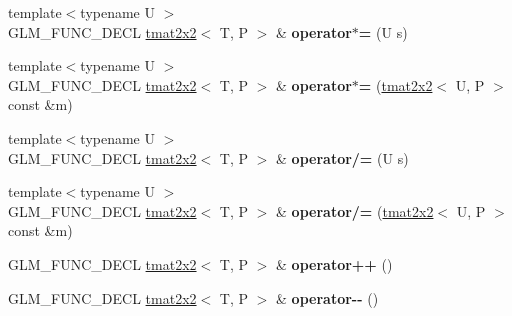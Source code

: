 \begin{DoxyCompactItemize}
\item 
{\footnotesize template$<$typename U $>$ }\\G\+L\+M\+\_\+\+F\+U\+N\+C\+\_\+\+D\+E\+CL \hyperlink{structglm_1_1detail_1_1tmat2x2}{tmat2x2}$<$ T, P $>$ \& {\bfseries operator$\ast$=} (U s)\hypertarget{structglm_1_1detail_1_1tmat2x2_a981d962c4d65dc12703e2b6e723ec981}{}\label{structglm_1_1detail_1_1tmat2x2_a981d962c4d65dc12703e2b6e723ec981}

\item 
{\footnotesize template$<$typename U $>$ }\\G\+L\+M\+\_\+\+F\+U\+N\+C\+\_\+\+D\+E\+CL \hyperlink{structglm_1_1detail_1_1tmat2x2}{tmat2x2}$<$ T, P $>$ \& {\bfseries operator$\ast$=} (\hyperlink{structglm_1_1detail_1_1tmat2x2}{tmat2x2}$<$ U, P $>$ const \&m)\hypertarget{structglm_1_1detail_1_1tmat2x2_ab56306a2ba75e6dbdd7eed704d6a90df}{}\label{structglm_1_1detail_1_1tmat2x2_ab56306a2ba75e6dbdd7eed704d6a90df}

\item 
{\footnotesize template$<$typename U $>$ }\\G\+L\+M\+\_\+\+F\+U\+N\+C\+\_\+\+D\+E\+CL \hyperlink{structglm_1_1detail_1_1tmat2x2}{tmat2x2}$<$ T, P $>$ \& {\bfseries operator/=} (U s)\hypertarget{structglm_1_1detail_1_1tmat2x2_a646ced88a0720120d4664a65a5a5ae29}{}\label{structglm_1_1detail_1_1tmat2x2_a646ced88a0720120d4664a65a5a5ae29}

\item 
{\footnotesize template$<$typename U $>$ }\\G\+L\+M\+\_\+\+F\+U\+N\+C\+\_\+\+D\+E\+CL \hyperlink{structglm_1_1detail_1_1tmat2x2}{tmat2x2}$<$ T, P $>$ \& {\bfseries operator/=} (\hyperlink{structglm_1_1detail_1_1tmat2x2}{tmat2x2}$<$ U, P $>$ const \&m)\hypertarget{structglm_1_1detail_1_1tmat2x2_adc3e315d4094456e7b9865b05bb13625}{}\label{structglm_1_1detail_1_1tmat2x2_adc3e315d4094456e7b9865b05bb13625}

\item 
G\+L\+M\+\_\+\+F\+U\+N\+C\+\_\+\+D\+E\+CL \hyperlink{structglm_1_1detail_1_1tmat2x2}{tmat2x2}$<$ T, P $>$ \& {\bfseries operator++} ()\hypertarget{structglm_1_1detail_1_1tmat2x2_ab22b8afc9da04be4ff28de825ccf0176}{}\label{structglm_1_1detail_1_1tmat2x2_ab22b8afc9da04be4ff28de825ccf0176}

\item 
G\+L\+M\+\_\+\+F\+U\+N\+C\+\_\+\+D\+E\+CL \hyperlink{structglm_1_1detail_1_1tmat2x2}{tmat2x2}$<$ T, P $>$ \& {\bfseries operator-\/-\/} ()\hypertarget{structglm_1_1detail_1_1tmat2x2_a06b4e73ada53476205e52ce060506c90}{}\label{structglm_1_1detail_1_1tmat2x2_a06b4e73ada53476205e52ce060506c90}


\end{DoxyCompactItemize}
